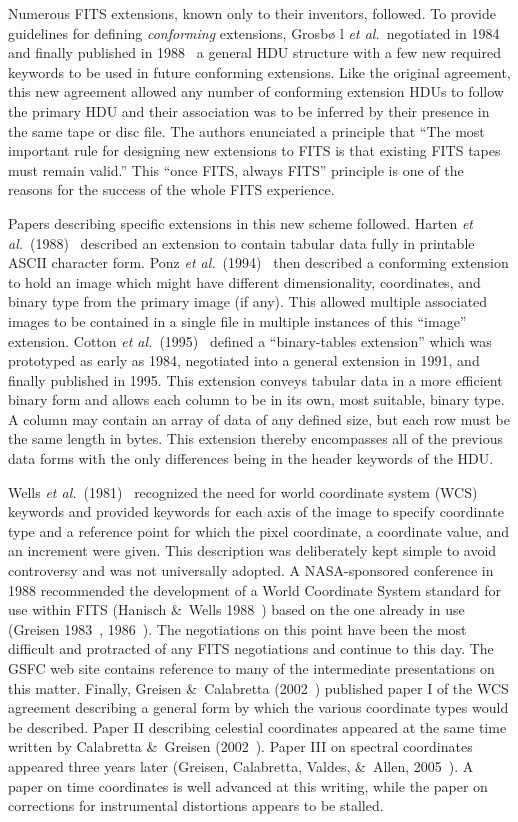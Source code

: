 \documentclass[twoside]{article}
\newcommand{\etal}{{\it et al.}}
\begin{document}
Numerous FITS extensions, known only to their inventors, followed.  To
provide guidelines for defining {\it conforming} extensions,  Grosb\o
l \etal~negotiated in 1984 and finally published in 1988~\cite{GHGW88}
a general HDU structure with a few new required keywords to be used in
future conforming extensions.  Like the original agreement, this new
agreement allowed any number of conforming extension HDUs to follow
the primary HDU and their association was to be inferred by their
presence in the same tape or disc file.  The authors enunciated a
principle that ``The most important rule for designing new extensions
to FITS is that existing FITS tapes must remain valid.''  This ``once
FITS, always FITS'' principle is one of the reasons for the success of
the whole FITS experience.

Papers describing specific extensions in this new scheme followed.
Harten \etal~(1988)~\cite{HGGW88} described an extension to contain
tabular data fully in printable ASCII character form.  Ponz
\etal~(1994)~\cite{PTM94} then described a conforming extension to
hold an image which might have different dimensionality, coordinates,
and binary type from the primary image (if any).  This allowed
multiple associated images to be contained in a single file in
multiple instances of this ``image'' extension.  Cotton
\etal~(1995)~\cite{CTP95} defined a ``binary-tables extension'' which
was prototyped as early as 1984, negotiated into a general extension
in 1991, and finally published in 1995.  This extension conveys
tabular data in a more efficient binary form and allows each column to
be in its own, most suitable, binary type.  A column may contain an
array of data of any defined size, but each row must be the same
length in bytes.  This extension thereby encompasses all of the
previous data forms with the only differences being in the header
keywords of the HDU\@.

Wells \etal~(1981)~\cite{WGH81} recognized the need for world
coordinate system (WCS) keywords and provided keywords for each axis
of the image to specify coordinate type and a reference point for
which the pixel coordinate, a coordinate value, and an increment were
given.  This description was deliberately kept simple to avoid
controversy and was not universally adopted.  A NASA-sponsored
conference in 1988 recommended the development of a World Coordinate
System standard for use within FITS  (Hanisch \&\ Wells
1988~\cite{HW88}) based on the one already in use (Greisen
1983~\cite{G83}, 1986~\cite{G88}).  The negotiations on this point
have been the most difficult and protracted of any FITS negotiations
and continue to this day.  The GSFC web site contains reference to
many of the intermediate presentations on this matter.  Finally,
Greisen \&\ Calabretta (2002~\cite{GC02}) published paper I of the WCS
agreement describing a general form by which the various coordinate
types would be described.  Paper II describing celestial coordinates
appeared at the same time written by Calabretta \&\ Greisen
(2002~\cite{CG02}).  Paper III on spectral coordinates appeared three
years later (Greisen, Calabretta, Valdes, \&\ Allen,
2005~\cite{GCVA05}).  A paper on time coordinates is well advanced at
this writing, while the paper on corrections for instrumental
distortions appears to be stalled.
\end{document}
